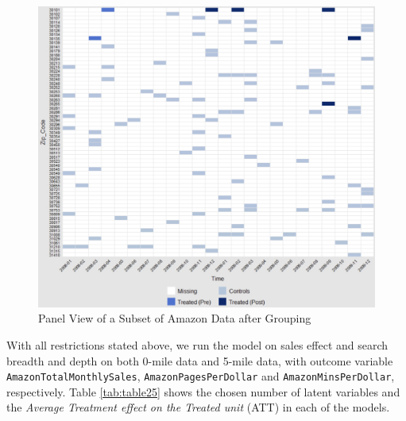 \documentclass{article}
\begin{document}
\begin{figure}[h]
	\centering
	\includegraphics[scale = 0.18]{pic/Panel_View.jpg}
	\caption{Panel View of a Subset of Amazon Data after Grouping}
	\label{fig:GSC1}
\end{figure}

With all restrictions stated above, we run the model on sales effect and search breadth and depth on both 0-mile data and 5-mile data, with outcome variable \texttt{AmazonTotalMonthlySales}, \texttt{AmazonPagesPerDollar} and \texttt{AmazonMinsPerDollar}, respectively. Table \ref{tab:table25} shows the chosen number of latent variables and the \textit{Average Treatment effect on the Treated unit} (ATT) in each of the models.
\end{document}

